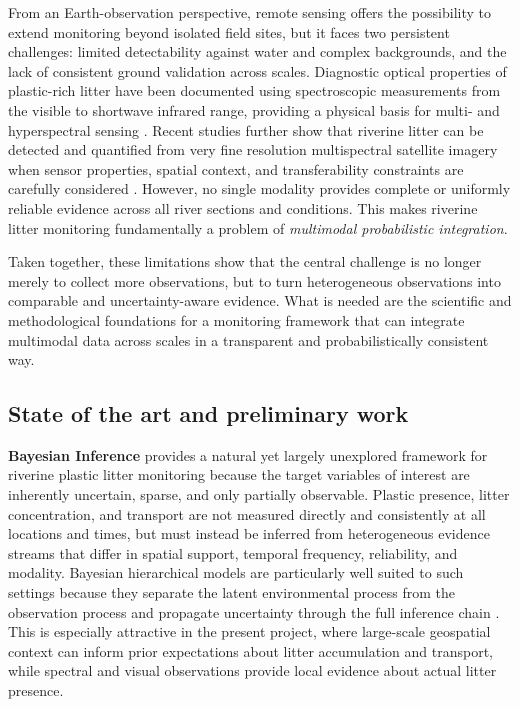 \documentclass{scrartcl}
\begin{document}
From an Earth-observation perspective, remote sensing offers the possibility to extend monitoring beyond isolated field sites, but it faces two persistent challenges: limited detectability against water and complex backgrounds, and the lack of consistent ground validation across scales. Diagnostic optical properties of plastic-rich litter have been documented using spectroscopic measurements from the visible to shortwave infrared range, providing a physical basis for multi- and hyperspectral sensing \citep{garaba2018airborne,garaba2020uvswir,goddijn2018concept,garaba2021concentration,knaeps2021hyperspectral,de2023hyperspectral,giz2023}. Recent studies further show that riverine litter can be detected and quantified from very fine resolution multispectral satellite imagery when sensor properties, spatial context, and transferability constraints are carefully considered \citep{garaba2024riverine,smith2025insights}. However, no single modality provides complete or uniformly reliable evidence across all river sections and conditions. This makes riverine litter monitoring fundamentally a problem of \emph{multimodal probabilistic integration}.

Taken together, these limitations show that the central challenge is no longer merely to collect more observations, but to turn heterogeneous observations into comparable and uncertainty-aware evidence. What is needed are the scientific and methodological foundations for a monitoring framework that can integrate multimodal data across scales in a transparent and probabilistically consistent way.

\subsection*{State of the art and preliminary work}

\textbf{Bayesian Inference} provides a natural yet largely unexplored framework for riverine plastic litter monitoring because the target variables of interest are inherently uncertain, sparse, and only partially observable. Plastic presence, litter concentration, and transport are not measured directly and consistently at all locations and times, but must instead be inferred from heterogeneous evidence streams that differ in spatial support, temporal frequency, reliability, and modality. Bayesian hierarchical models are particularly well suited to such settings because they separate the latent environmental process from the observation process and propagate uncertainty through the full inference chain \citep{wikle1998hierarchical,wikle2003hierarchical}. This is especially attractive in the present project, where large-scale geospatial context can inform prior expectations about litter accumulation and transport, while spectral and visual observations provide local evidence about actual litter presence.
\end{document}
